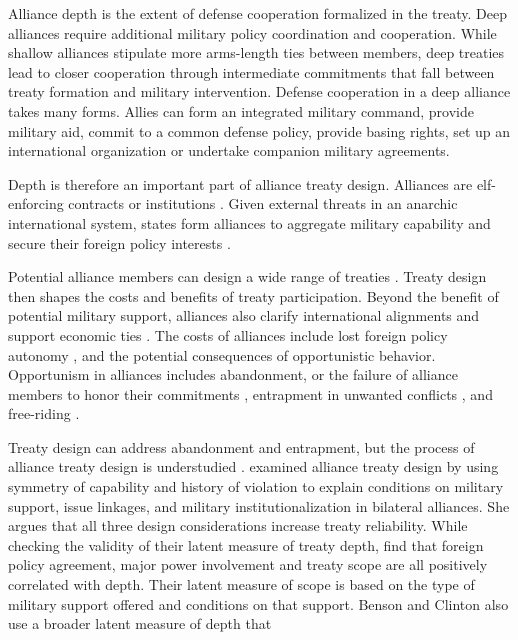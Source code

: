 \documentclass[12pt]{article}
\begin{document}
Alliance depth is the extent of defense cooperation formalized in the treaty. 
Deep alliances require additional military policy coordination and cooperation. 
While shallow alliances stipulate more arms-length ties between members, deep treaties lead to closer cooperation through intermediate commitments that fall between treaty formation and military intervention. 
Defense cooperation in a deep alliance takes many forms. 
Allies can form an integrated military command, provide military aid, commit to a common defense policy, provide basing rights, set up an international organization or undertake companion military agreements. 


Depth is therefore an important part of alliance treaty design.
Alliances are elf-enforcing contracts or institutions \citep{Leedsetal2002, Morrow2000}.
Given external threats in an anarchic international system, states form alliances to aggregate military capability and secure their foreign policy interests \citep{Altfield1984, Smith1995, Snyder1997, FordhamPoast2014}. 


Potential alliance members can design a wide range of treaties \citep{Leedsetal2000, Leedsetal2002, Benson2012, BensonClinton2016}. 
Treaty design then shapes the costs and benefits of treaty participation. 
Beyond the benefit of potential military support, alliances also clarify international alignments \citep{Snyder1990} and support economic ties \citep{Gowa1995, Li2003, Long2003, Fordham2010, WolfordKim2017}. 
The costs of alliances include lost foreign policy autonomy \citep{Altfield1984, Morrow2000, Johnson2015}, and the potential consequences of opportunistic behavior. 
Opportunism in alliances includes abandonment, or the failure of alliance members to honor their commitments \citep{Leeds2003a, BerkemeierFuhrmann2018}, entrapment in unwanted conflicts \citep{Snyder1984}, and free-riding \citep{Morrow2000}.   


Treaty design can address abandonment and entrapment, but the process of alliance treaty design is understudied \citep{Poast2019a}. 
\citet{Mattes2012} examined alliance treaty design by using symmetry of capability and history of violation to explain conditions on military support, issue linkages, and military institutionalization in bilateral alliances. 
She argues that all three design considerations increase treaty reliability.  
While checking the validity of their latent measure of treaty depth, \citet{BensonClinton2016} find that foreign policy agreement, major power involvement and treaty scope are all positively correlated with depth. 
Their latent measure of scope is based on the type of military support offered and conditions on that support. 
Benson and Clinton also use a broader latent measure of depth that 
\end{document}
